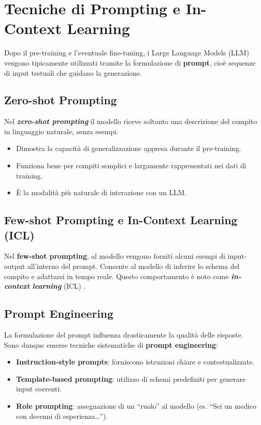 \section{Tecniche di Prompting e In-Context Learning}

Dopo il pre-training e l'eventuale fine-tuning, i Large Language Models (LLM) 
vengono tipicamente utilizzati tramite la formulazione di \textbf{prompt}, cioè sequenze di input testuali che guidano la generazione.

\subsection{Zero-shot Prompting}
Nel \textbf{\textit{zero-shot prompting}} il modello riceve soltanto una descrizione del compito 
in linguaggio naturale, senza esempi.
\begin{itemize}
    \item Dimostra la capacità di generalizzazione appresa durante il pre-training.
    \item Funziona bene per compiti semplici e largamente rappresentati nei dati di training.
    \item È la modalità più naturale di interazione con un LLM.
\end{itemize}

\subsection{Few-shot Prompting e In-Context Learning (ICL)}
Nel \textbf{few-shot prompting}, al modello vengono forniti alcuni esempi 
di input-output all'interno del prompt. Consente al modello di inferire lo schema del compito e adattarsi in tempo reale.
Questo comportamento è noto come \textbf{\textit{in-context learning}} (ICL) \cite{dong2023survey}.

\subsection{Prompt Engineering}
La formulazione del prompt influenza drasticamente la qualità delle risposte.
Sono dunque emerse tecniche sistematiche di \textbf{prompt engineering}:
\begin{itemize}
    \item \textbf{Instruction-style prompts}: forniscono istruzioni chiare e contestualizzate.
    \item \textbf{Template-based prompting}: utilizzo di schemi predefiniti per generare input coerenti.
    \item \textbf{Role prompting}: assegnazione di un “ruolo” al modello (es. “Sei un medico con decenni di esperienza…”).
\end{itemize}

